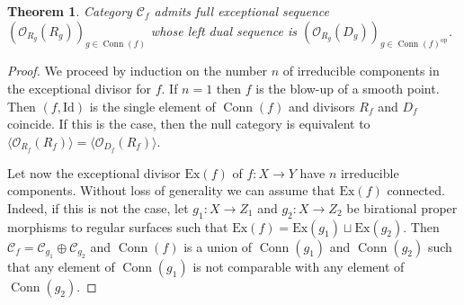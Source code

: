 \documentclass[12pt,a4paper]{amsart}
\newcommand{\cC}{{\mathcal{C}}}
\newcommand{\oO}{{\mathcal{O}}}
\newcommand{\Conn}{\mathop{\textrm{Conn}}\nolimits}
\newcommand{\opp}{\mathop{\textrm{op}}\nolimits}
\newtheorem{THM}[LEM]{Theorem}
\theoremstyle{definition}
\begin{document}
\begin{THM}\label{thm_exc_coll_C_f}
	Category $\cC_f$ admits full exceptional sequence $\left(\oO_{R_g}(R_g)\right)_{g\in \Conn(f)}$ whose left dual sequence is $\left( \oO_{R_g}(D_g) \right)_{g\in \Conn(f)^{\opp}}$.
\end{THM}

\begin{proof}
We proceed by induction on the number $n$ of irreducible components in the exceptional divisor for $f$. If $n=1$ then $f$ is the blow-up of a smooth point. Then $(f, \textrm{Id})$ is the single element of $\Conn(f)$ and divisors $R_f$ and $D_f$ coincide. If this is the case, then the null category is equivalent to $\langle \oO_{R_f}(R_f) \rangle = \langle \oO_{D_f}(R_f) \rangle$.

Let now the exceptional divisor $\textrm{Ex}(f)$ of $f\colon X\to Y$ have $n$ irreducible components. Without loss of generality we can assume that $\textrm{Ex}(f)$ connected. Indeed, if this is not the case, let $g_1 \colon X\to Z_1$ and $g_2 \colon X\to Z_2$ be birational proper morphisms to regular surfaces such that $\textrm{Ex}(f) = \textrm{Ex}(g_1) \sqcup \textrm{Ex}(g_2)$. Then $\cC_f = \cC_{g_1} \oplus \cC_{g_2}$ and $\Conn(f)$ is a union of $\Conn(g_1)$ and $\Conn(g_2)$ such that any element of $\Conn(g_1)$ is not comparable with any element of $\Conn(g_2)$.


\end{proof}
\end{document}
